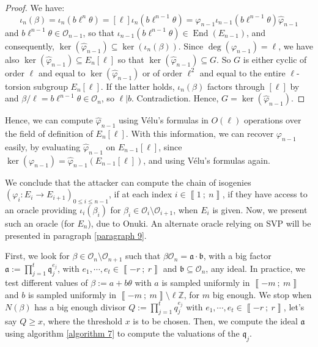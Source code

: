 \documentclass[a4paper,10pt]{report}
\theoremstyle{definition}
\theoremstyle{plain}
\theoremstyle{definition}
\newcommand{\Z}{\mathbb{Z}}
\newcommand{\mO}{\mathcal{O}}
\renewcommand{\i}[2]{\left\llbracket #1~;~#2\right\rrbracket}
\renewcommand{\(}{\left(}
\renewcommand{\)}{\right)}
\newcommand{\mf}[1]{\mathfrak{#1}}
\DeclareMathOperator{\End}{End}
\begin{document}
\begin{proof}
We have:
\[\iota_n(\beta)=\iota_n(b\ell^n\theta)=[\ell]\iota_n(b\ell^{n-1}\theta)=\varphi_{n-1}\iota_{n-1}(b\ell^{n-1}\theta)\widehat{\varphi}_{n-1}\]
and $b\ell^{n-1}\theta\in\mO_{n-1}$, so that $\iota_{n-1}(b\ell^{n-1}\theta)\in\End(E_{n-1})$, and consequently, $\ker(\widehat{\varphi}_{n-1})\subseteq\ker(\iota_n(\beta))$. Since $\deg(\varphi_{n-1})=\ell$, we have also $\ker(\widehat{\varphi}_{n-1})\subseteq E_{n}[\ell]$ so that $\ker(\widehat{\varphi}_{n-1})\subseteq G$.  So $G$ is either cyclic of order $\ell$ and equal to $\ker(\widehat{\varphi}_{n-1})$ or of order $\ell^2$ and equal to the entire $\ell$-torsion subgroup $E_n[\ell]$. If the latter holds, $\iota_n(\beta)$ factors through $[\ell]$ by \cite[corollary III.4.11]{Silverman1} and $\beta/\ell=b\ell^{n-1}\theta\in\mO_n$, so $\ell|b$. Contradiction. Hence, $G=\ker(\widehat{\varphi}_{n-1})$.
\end{proof}

Hence, we can compute $\widehat{\varphi}_{n-1}$ using V\'{e}lu's formulas in $O(\ell)$ operations over the field of definition of $E_n[\ell]$. With this information, we can recover $\varphi_{n-1}$ easily, by evaluating $\widehat{\varphi}_{n-1}$ on $E_{n-1}[\ell]$, since $\ker(\varphi_{n-1})=\widehat{\varphi}_{n-1}(E_{n-1}[\ell])$, and using V\'{e}lu's formulas again.

We conclude that the attacker can compute the chain of isogenies $(\varphi_i : E_i\longrightarrow E_{i+1})_{0\leq i\leq n-1}$, if at each index $i\in\i{1}{n}$,  if they have access to an oracle providing $\iota_i(\beta_i)$ for $\beta_i\in\mO_i\setminus\mO_{i+1}$, when $E_{i}$ is given. Now, we present such an oracle (for $E_n$), due to Onuki. An alternate oracle relying on SVP will be presented in paragraph \ref{paragraph 9}.

First, we look for $\beta\in\mO_n\setminus\mO_{n+1}$ such that $\beta\mO_n=\mf{a}\cdot \mf{b}$, with a big factor $\mf{a}:=\prod_{j=1}^t\mf{q}_j^{e_j}$, with $e_1, \cdots, e_t\in\i{-r}{r}$ and $\mf{b}\subseteq\mO_n$, any ideal. In practice, we test different values of $\beta:=a+b\theta$ with $a$ is sampled uniformly in $\i{-m}{m}$ and $b$ is sampled uniformly in $\i{-m}{m}\setminus\ell\Z$, for $m$ big enough. We stop when $N(\beta)$ has a big enough divisor $Q:=\prod_{j=1}^t q_j^{e_j}$ with $e_1, \cdots, e_t\in\i{-r}{r}$, let's say $Q\geq x$, where the threshold $x$ is to be chosen. Then, we compute the ideal $\mf{a}$ using algorithm \ref{algorithm 7} to compute the valuations of the $\mf{q}_j$.  
\end{document}
